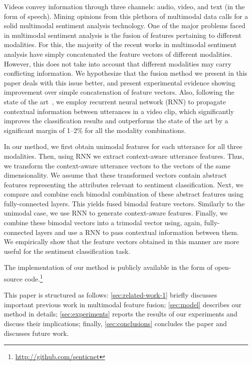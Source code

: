\documentclass[review]{elsarticle}
\newcommand\?[1]{\hl{#1}}
\begin{document}
Videos convey information through three channels: audio, video, and text (in
the form of speech). Mining opinions from this plethora of multimodal data calls for
a solid multimodal sentiment analysis technology. One of the major problems
faced in multimodal sentiment analysis is the fusion of features pertaining to
different modalities. For this, the majority of the recent works in multimodal sentiment
analysis have simply concatenated the feature vectors of different
modalities. However, this does not take into account that different modalities
may carry conflicting information. We hypothesize that the fusion method we
present in this paper deals with this issue better, and present experimental
evidence showing improvement over simple concatenation of feature vectors. Also,
following the state of the art~\citep{porcon}, we employ recurrent
neural network (RNN) to propagate contextual information between utterances in a
video clip, which significantly improves the classification results and outperforms the
state of the art by a significant margin of 1--2\% for all the modality
combinations.

In our method, we first obtain unimodal features for each utterance for all
three modalities. Then, using RNN we extract context-aware utterance features. 
Thus, we transform the context-aware utterance vectors to the
vectors of the same dimensionality. We assume that these transformed vectors contain
abstract features representing the attributes relevant to sentiment
classification. Next, we compare and combine each bimodal combination of these
abstract features using fully-connected layers. This yields fused bimodal
feature vectors. Similarly to the unimodal case, we use RNN to generate
context-aware features. Finally, we combine these bimodal vectors into a
trimodal vector using, again, fully-connected layers and use a RNN to pass
contextual information between them. We empirically show that the feature vectors
obtained in this manner are more useful for the sentiment classification task.

The implementation of our method is publicly available in the form of open-source code.\footnote{\url{http://github.com/senticnet}}

This paper is structured as follows: \cref{sec:related-work-1} briefly discusses important previous work in multimodal feature fusion; \cref{sec:model} describes our method in details; \cref{sec:experiments} reports the results of our experiments and discuss their implications; finally, \cref{sec:conclusions} concludes the paper and discusses future work.
\end{document}
